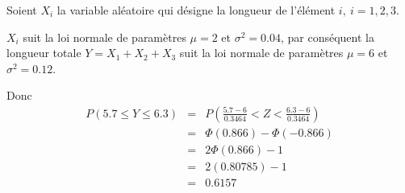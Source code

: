 \begin{questions}
\begin{solution}
    Soient $X_i$ la variable aléatoire qui désigne la longueur de l'élément $i,\ i=1, 2, 3$.

    $X_i$ suit la loi normale de paramètres $\mu =2$ et $\sigma^2 =0.04$, par conséquent la longueur totale $Y=X_1+X_2+X_3$ suit la loi normale de paramètres $\mu =6$ et $\sigma^2 =0.12$.

 Donc
 $$
 \begin{array}{ccl}
     P(5.7\leq Y \leq 6.3) &=& P(\frac{5.7-6}{0.3464} < Z<\frac{6.3-6}{0.3464})  \\
      &=& \Phi(0.866) -  \Phi(-0.866) \\
      &=& 2 \Phi(0.866) -1 \\
      &=& 2(0.80785) -1 \\
      &=& 0.6157
 \end{array}
 $$
 \end{solution}

\end{questions}
 
